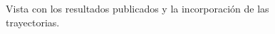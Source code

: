 \begin{figure}[h!]
  \centering
  \caption{Vista con los resultados publicados y la incorporaci\'on de las trayectorias.}
  \label{fig:pantfinal}
\end{figure}
% 
% 
% 
%  


